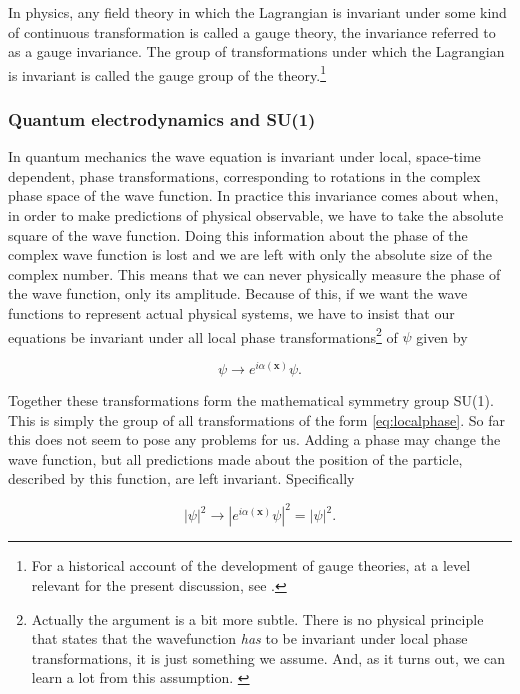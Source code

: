 In physics, any field theory in which the Lagrangian is invariant under some kind of continuous transformation is called a gauge theory, the invariance referred to as a gauge invariance. The group of transformations under which the Lagrangian is invariant is called the gauge group of the theory.\footnote{For a historical account of the development of gauge theories, at a level relevant for the present discussion, see \cite{gross1992gtp}.}

\subsubsection{Quantum electrodynamics and SU(1)}
In quantum mechanics the wave equation is invariant under local, space-time dependent, phase transformations, corresponding to rotations in the complex phase space of the wave function. In practice this invariance comes about when, in order to make predictions of physical observable, we have to take the absolute square of the wave function. Doing this information about the phase of the complex wave function is lost and we are left with only the absolute size of the complex number. This means that we can never physically measure the phase of the wave function, only its amplitude. Because of this, if we want the wave functions to represent actual physical systems, we have to insist that our equations be invariant under all local phase transformations\footnote{Actually the argument is a bit more subtle. There is no physical principle that states that the wavefunction \emph{has} to be invariant under local phase transformations, it is just something we assume. And, as it turns out, we can learn a lot from this assumption. \cite{griffiths1987iep}} of $\psi$ given by

\begin{equation} \label{eq:localphase}
    \psi \rightarrow e^{i\alpha(\mathbf{x})} \psi.
\end{equation}

Together these transformations form the mathematical symmetry group SU(1). This is simply the group of all transformations of the form \eqref{eq:localphase}.  So far this does not seem to pose any problems for us. Adding a phase may change the wave function, but all predictions made about the position of the particle, described by this function, are left invariant. Specifically

\begin{equation}
	|\psi|^2 \rightarrow |e^{i\alpha(\mathbf{x})} \psi|^2 = |\psi|^2.
\end{equation}

